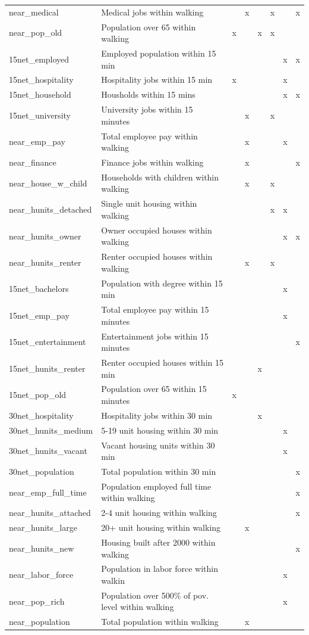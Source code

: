 \documentclass[11pt]{article}
\begin{document}
\begin{appendices}
\begin{tabular}{llcccccc}
near\_medical&Medical jobs within walking&&x&&x&&x\\
near\_pop\_old&Population over 65 within walking&x&&x&x&&\\
15net\_employed&Employed population within 15 min&&&&&x&x\\
15net\_hospitality&Hospitality jobs within 15 min&x&&&&x&\\
15net\_household&Housholds within 15 mins&&&&&x&x\\
15net\_university&University jobs within 15 minutes&&x&&x&&\\
near\_emp\_pay&Total employee pay within walking&&x&&&x&\\
near\_finance&Finance jobs within walking&&x&&&&x\\
near\_house\_w\_child&Households with children within walking&&x&&x&&\\
near\_hunits\_detached&Single unit housing within walking&&&&x&x&\\
near\_hunits\_owner&Owner occupied houses within walking&&&&&x&x\\
near\_hunits\_renter&Renter occupied houses within walking&&x&&x&&\\
15net\_bachelors&Population with degree within 15 min&&&&&x&\\
15net\_emp\_pay&Total employee pay within 15 minutes&&&&&x&\\
15net\_entertainment&Entertainment jobs within 15 minutes&&&&&&x\\
15net\_hunits\_renter&Renter occupied houses within 15 min&&&x&&&\\
15net\_pop\_old&Population over 65 within 15 minutes&x&&&&&\\
30net\_hospitality&Hospitality jobs within 30 min&&&x&&&\\
30net\_hunits\_medium&5-19 unit housing within 30 min&&&&&x&\\
30net\_hunits\_vacant&Vacant housing units within 30 min&&&&&x&\\
30net\_population&Total population within 30 min&&&&&&x\\
near\_emp\_full\_time&Population employed full time within walking&&&&&&x\\
near\_hunits\_attached&2-4 unit housing within walking&&&&&&x\\
near\_hunits\_large&20+ unit housing within walking&&x&&&&\\
near\_hunits\_new&Housing built after 2000 within walking&&&&&&x\\
near\_labor\_force&Population in labor force within walkin&&&&&x&\\
near\_pop\_rich&Population over 500\% of pov. level within walking&&&&&x&\\
near\_population&Total population within walking&&x&&&&\\
\end{tabular}
\endgroup
\hspace*{-0.4cm}
\end{appendices}










 

\pagebreak
\end{document}
